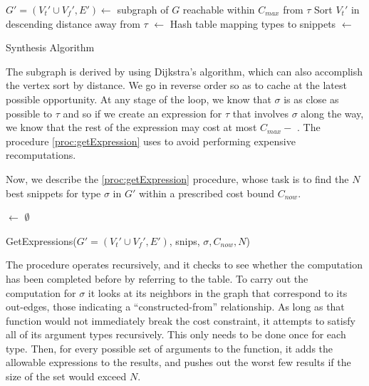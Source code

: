 \begin{algorithm}
\BlankLine
$G'=(V_t'\cup V_f', E') \longleftarrow$ subgraph of $G$ reachable within $C_{max}$ from $\tau$ \;
Sort $V_t'$ in descending distance away from $\tau$ \;
\Snips $\longleftarrow$ Hash table mapping types to snippets \;
\Exprs $\longleftarrow$ \Snips[$\tau$] \;
\caption{Synthesis Algorithm}\label{proc:synthesize}
\end{algorithm}

The subgraph is derived by using Dijkstra's algorithm, which can also
accomplish the vertex sort by distance. We go in reverse order so as
to cache at the latest possible opportunity. At any stage of the loop,
we know that $\sigma$ is as close as possible to $\tau$ and so if we
create an expression for $\tau$ that involves $\sigma$ along the way,
we know that the rest of the expression may cost at most $C_{max} - $
\Dist{$\sigma$}. The procedure \ref{proc:getExpression} uses \Snips to
avoid performing expensive recomputations.

Now, we describe the \ref{proc:getExpression} procedure, whose task is
to find the $N$ best snippets for type $\sigma$ in $G'$ within a
prescribed cost bound $C_{now}$.
\begin{procedure}
\lIf{$\sigma$ $\in$ \Keys{\Snips}}{\Return{\Snips$[\sigma]$}}
\Results $\leftarrow$ $\emptyset$ \;
\Return{\Results}
\caption{GetExpressions({$G'=(V_t' \cup V_f', E')$}, snips, $\sigma, C_{now}, N$)}\label{proc:getExpression}
\end{procedure}
The procedure operates recursively, and it checks to see whether the
computation has been completed before by referring to the \Snips
table. To carry out the computation for $\sigma$ it looks at its
neighbors in the graph that correspond to its out-edges, those
indicating a ``constructed-from'' relationship. As long as that
function would not immediately break the cost constraint, it attempts
to satisfy all of its argument types recursively. This only needs to
be done once for each type. Then, for every possible set of arguments
to the function, it adds the allowable expressions to the results, and
pushes out the worst few results if the size of the set would exceed
$N$.

